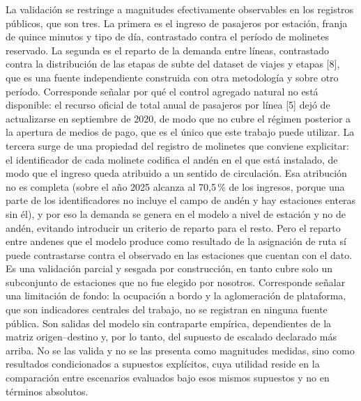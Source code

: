 \documentclass{article}
\begin{document}
La validación se restringe a magnitudes efectivamente observables en los registros públicos, que son tres. La
primera es el ingreso de pasajeros por estación, franja de quince minutos y tipo de día, contrastado contra
el período de molinetes reservado. La segunda es el reparto de la demanda entre líneas, contrastado contra la
distribución de las etapas de subte del dataset de viajes y etapas [8], que es una fuente independiente
construida con otra metodología y sobre otro período. Corresponde señalar por qué el control agregado natural
no está disponible: el recurso oficial de total anual de pasajeros por línea [5] dejó de actualizarse en
septiembre de 2020, de modo que no cubre el régimen posterior a la apertura de medios de pago, que es el
único que este trabajo puede utilizar. La tercera surge de una propiedad del registro de molinetes que
conviene explicitar:
el identificador de cada molinete codifica el andén en el que está instalado, de modo que el ingreso queda
atribuido a un sentido de circulación. Esa atribución no es completa (sobre el año 2025 alcanza al
70,5\,\% de los ingresos, porque una parte de los identificadores no incluye el campo de andén y hay
estaciones enteras sin él), y por eso la demanda se genera en el modelo a nivel de estación y no de andén,
evitando introducir un criterio de reparto para el resto. Pero el reparto entre andenes que el modelo produce
como resultado de la asignación de ruta sí puede contrastarse contra el observado en las estaciones que
cuentan con el dato. Es una validación parcial y sesgada por construcción, en tanto cubre solo un subconjunto
de estaciones que no fue elegido por nosotros.
Corresponde señalar una limitación de fondo: la ocupación a bordo y la aglomeración de plataforma, que son
indicadores centrales del trabajo, no se registran en ninguna fuente pública. Son salidas del modelo sin
contraparte empírica, dependientes de la matriz origen--destino y, por lo tanto, del supuesto de escalado
declarado más arriba. No se las valida y no se las presenta como magnitudes medidas, sino como resultados
condicionados a supuestos explícitos, cuya utilidad reside en la comparación entre escenarios evaluados bajo
esos mismos supuestos y no en términos absolutos.
\end{document}
